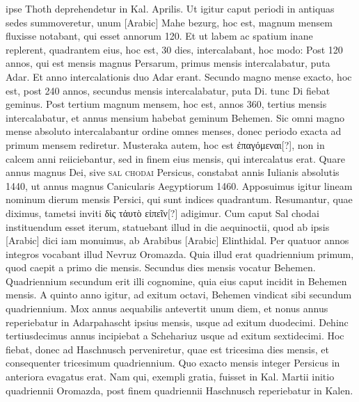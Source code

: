 ipse Thoth deprehendetur in Kal. Aprilis.
Ut igitur caput periodi
in antiquas sedes summoveretur, unum \textarabic{}[Arabic] Mahe bezurg,
hoc est, magnum mensem fluxisse notabant, qui esset annorum
120. %
%
Et ut labem ac spatium inane replerent, quadrantem eius, hoc
est, 30 dies, intercalabant, hoc modo: Post 120 annos, qui est mensis
magnus Persarum, primus mensis intercalabatur, puta Adar.
Et
anno intercalationis duo Adar erant.
Secundo magno mense exacto,
hoc est, post 240 annos, secundus mensis intercalabatur, puta Di. %
 tunc
Di fiebat geminus.
Post tertium magnum mensem, hoc est, annos
360, tertius mensis intercalabatur, et annus  mensium habebat
geminum Behemen.
Sic omni magno mense absoluto intercalabantur
ordine omnes menses, donec periodo exacta ad primum
mensem rediretur.
Musteraka autem, hoc est \textgreek{ἐπαγόμεναι}[?], non in
calcem anni reiiciebantur, sed in finem eius mensis, qui intercalatus
erat.
Quare annus magnus Dei, sive \textsc{sal chodai} Persicus,
constabat annis Iulianis absolutis 1440, ut annus magnus Canicularis
Aegyptiorum 1460.
Apposuimus igitur lineam nominum dierum
mensis Persici, qui sunt indices quadrantum.
Resumantur, quae
diximus, tametsi inviti %
 \textgreek{δὶς τἀυτὸ εἰπεῖν}[?] adigimur.
Cum caput Sal chodai
instituendum esset iterum, statuebant illud in die aequinoctii,
quod ab ipsis \textarabic{}[Arabic] dici iam monuimus, ab Arabibus
 \textarabic{}[Arabic]
Elinthidal.
Per quatuor annos integros vocabant illud Nevruz Oromazda.
Quia illud erat quadriennium primum, quod caepit a primo
die mensis.
Secundus dies mensis vocatur Behemen.
Quadriennium
secundum erit illi cognomine, quia eius caput incidit in Behemen
mensis.
A quinto anno igitur, ad exitum octavi, Behemen vindicat
sibi secundum quadriennium.
Mox annus aequabilis antevertit
unum diem, et nonus annus reperiebatur in Adarpahascht ipsius mensis,
usque %
 ad exitum duodecimi.
Dehinc tertiusdecimus annus incipiebat
a Schehariuz usque ad exitum sextidecimi.
Hoc fiebat, donec ad
Haschnusch perveniretur, quae est tricesima dies mensis, et consequenter
tricesimum quadriennium.
Quo exacto mensis integer Persicus
in anteriora evagatus erat.
Nam qui, exempli gratia, fuisset in Kal. %
Martii initio quadriennii Oromazda, post finem quadriennii Haschnusch
reperiebatur in Kalen. %
